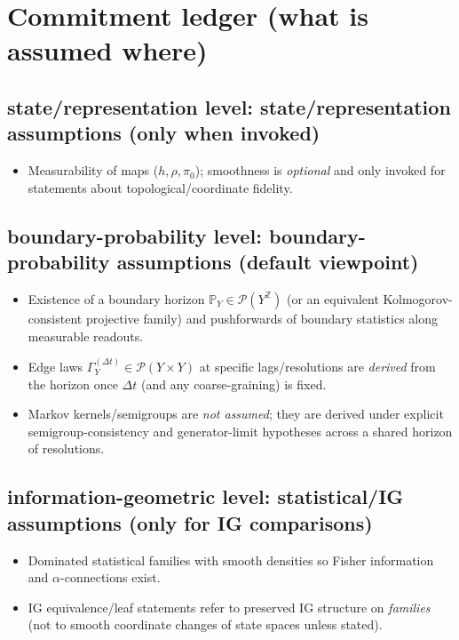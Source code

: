 \documentclass[11pt]{article}
\newcommand{\Pcal}{\mathcal{P}}
\begin{document}
\section*{Commitment ledger (what is assumed where)}
\subsection*{state/representation level: state/representation assumptions (only when invoked)}
\begin{itemize}[leftmargin=1.6em]
\item Measurability of maps ($h,\rho,\pi_0$); smoothness is \emph{optional} and only invoked for statements about topological/coordinate fidelity.
\end{itemize}

\subsection*{boundary-probability level: boundary-probability assumptions (default viewpoint)}
\begin{itemize}[leftmargin=1.6em]
\item Existence of a boundary horizon $\mathbb P_Y\in\Pcal(Y^{\mathbb Z})$ (or an equivalent Kolmogorov-consistent projective family) and pushforwards of boundary statistics along measurable readouts.
\item Edge laws $\Gamma_Y^{(\Delta t)}\in\Pcal(Y\times Y)$ at specific lags/resolutions are \emph{derived} from the horizon once $\Delta t$ (and any coarse-graining) is fixed.
\item Markov kernels/semigroups are \emph{not assumed}; they are derived under explicit semigroup-consistency and generator-limit hypotheses across a shared horizon of resolutions.
\end{itemize}

\subsection*{information-geometric level: statistical/IG assumptions (only for IG comparisons)}
\begin{itemize}[leftmargin=1.6em]
\item Dominated statistical families with smooth densities so Fisher information and $\alpha$-connections exist.
\item IG equivalence/leaf statements refer to preserved IG structure on \emph{families} (not to smooth coordinate changes of state spaces unless stated).
\end{itemize}
\end{document}
